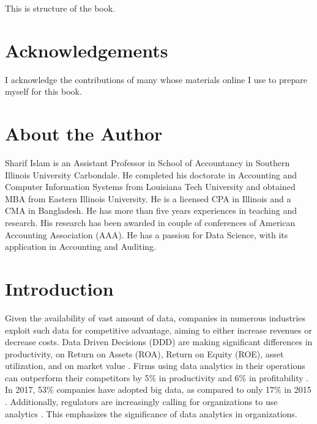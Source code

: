 \documentclass[
]{book}
\begin{document}
This is structure of the book.

\hypertarget{acknowledgements}{%
\chapter*{Acknowledgements}\label{acknowledgements}}


I acknowledge the contributions of many whose materials online I use to prepare myself for this book.

\hypertarget{about-the-author}{%
\chapter*{About the Author}\label{about-the-author}}


Sharif Islam is an Assistant Professor in School of Accountancy in Southern Illinois University Carbondale. He completed his doctorate in Accounting and Computer Information Systems from Louisiana Tech University and obtained MBA from Eastern Illinois University. He is a licensed CPA in Illinois and a CMA in Bangladesh. He has more than five years experiences in teaching and research. His research has been awarded in couple of conferences of American Accounting Association (AAA). He has a passion for Data Science, with its application in Accounting and Auditing.

\renewcommand{\chaptermark}[1]{\markboth{\uppercase{\thechapter. \ #1}}{}}

\mainmatter

\hypertarget{introduction}{%
\chapter{Introduction}\label{introduction}}

Given the availability of vast amount of data, companies in numerous industries exploit such data for competitive advantage, aiming to either increase revenues or decrease costs. Data Driven Decisions (DDD) are making significant differences in productivity, on Return on Assets (ROA), Return on Equity (ROE), asset utilization, and on market value \citep{provost_data_2013}. Firms using data analytics in their operations can outperform their competitors by 5\% in productivity and 6\% in profitability \citep{barton_making_2012}. In 2017, 53\% companies have adopted big data, as compared to only 17\% in 2015 \citep{columbus_53_2017}. Additionally, regulators are increasingly calling for organizations to use analytics \citep{protiviti_embracing_2017}. This emphasizes the significance of data analytics in organizations.
\end{document}

